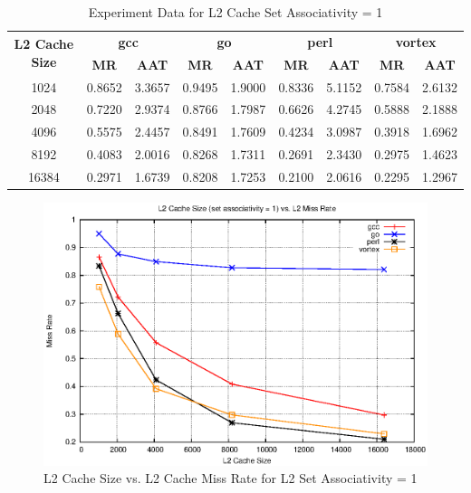 \documentclass[a4paper]{article}
\begin{document}
\begin{table}[htbp]
    \centering
    \begin{tabular}{|c|c|c|c|c|c|c|c|c|}
        \hline
        \multirow{2}[4]{*}{\bf L2 Cache Size} & \multicolumn{2}{c|}{\bf gcc} & \multicolumn{2}{c|}{\bf go} & \multicolumn{2}{c|}{\bf perl}          &\multicolumn{2}{c|}{\bf vortex}\\
        \cline{2-9} & \bf MR & \bf AAT & \bf MR & \bf AAT & \bf MR & \bf AAT & \bf MR & \bf AAT \\
        \hline
        1024 & 0.8652 & 3.3657 & 0.9495 & 1.9000 & 0.8336 & 5.1152 & 0.7584 & 2.6132 \\
        2048 & 0.7220 & 2.9374 & 0.8766 & 1.7987 & 0.6626 & 4.2745 & 0.5888 & 2.1888 \\
        4096 & 0.5575 & 2.4457 & 0.8491 & 1.7609 & 0.4234 & 3.0987 & 0.3918 & 1.6962 \\
        8192 & 0.4083 & 2.0016 & 0.8268 & 1.7311 & 0.2691 & 2.3430 & 0.2975 & 1.4623 \\
        16384 & 0.2971 & 1.6739 & 0.8208 & 1.7253 & 0.2100 & 2.0616 & 0.2295 & 1.2967 \\
        \hline
    \end{tabular}
    \captionsetup{justification=centering}
    \caption{Experiment Data for L2 Cache Set Associativity = 1}
    \label{tab:l2mr_data_sa1}
\end{table}

\begin{figure}
    \centering
    \includegraphics[scale=1.3] {l2_sa_1.eps}
    \caption{L2 Cache Size vs. L2 Cache Miss Rate for L2 Set Associativity = 1}
    \label{fig:l2mr_graph_sa1}
\end{figure}
\end{document}
